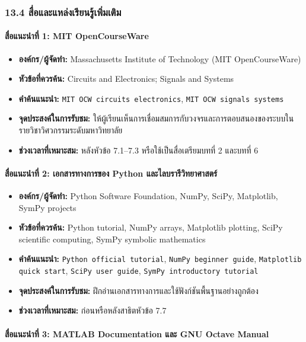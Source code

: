 \subsubsection{13.4 สื่อและแหล่งเรียนรู้เพิ่มเติม}

\paragraph{สื่อแนะนำที่ 1: MIT OpenCourseWare}

\begin{itemize}
    \item \textbf{องค์กร/ผู้จัดทำ:} Massachusetts Institute of Technology (MIT OpenCourseWare)
    \item \textbf{หัวข้อที่ควรค้น:} Circuits and Electronics; Signals and Systems
    \item \textbf{คำค้นแนะนำ:} \texttt{MIT OCW circuits electronics}, \texttt{MIT OCW signals systems}
    \item \textbf{จุดประสงค์ในการรับชม:} ให้ผู้เรียนเห็นการเชื่อมสมการกับวงจรและการตอบสนองของระบบในรายวิชาวิศวกรรมระดับมหาวิทยาลัย
    \item \textbf{ช่วงเวลาที่เหมาะสม:} หลังหัวข้อ 7.1–7.3 หรือใช้เป็นสื่อเตรียมบทที่ 2 และบทที่ 6
\end{itemize}

\paragraph{สื่อแนะนำที่ 2: เอกสารทางการของ Python และไลบรารีวิทยาศาสตร์}

\begin{itemize}
    \item \textbf{องค์กร/ผู้จัดทำ:} Python Software Foundation, NumPy, SciPy, Matplotlib, SymPy projects
    \item \textbf{หัวข้อที่ควรค้น:} Python tutorial, NumPy arrays, Matplotlib plotting, SciPy scientific computing, SymPy symbolic mathematics
    \item \textbf{คำค้นแนะนำ:} \texttt{Python official tutorial}, \texttt{NumPy beginner guide}, \texttt{Matplotlib quick start}, \texttt{SciPy user guide}, \texttt{SymPy introductory tutorial}
    \item \textbf{จุดประสงค์ในการรับชม:} ฝึกอ่านเอกสารทางการและใช้ฟังก์ชันพื้นฐานอย่างถูกต้อง
    \item \textbf{ช่วงเวลาที่เหมาะสม:} ก่อนหรือหลังสาธิตหัวข้อ 7.7
\end{itemize}

\paragraph{สื่อแนะนำที่ 3: MATLAB Documentation และ GNU Octave Manual}

